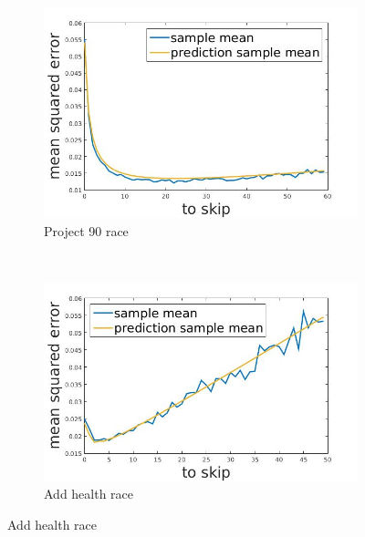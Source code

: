\documentclass[12pt]{report}
\begin{document}
\begin{figure}[h]
    \centering
    \begin{subfigure}[b]{0.4\textwidth}
        \includegraphics[width=\textwidth]{pr90race}
        \caption{ Project 90 race}

    \end{subfigure}
	~
    \begin{subfigure}[b]{0.4\textwidth}
        \includegraphics[width=\textwidth]{studRace}
        \caption{ Add health race }

    \end{subfigure}   
\end{figure}    
\end{document}
